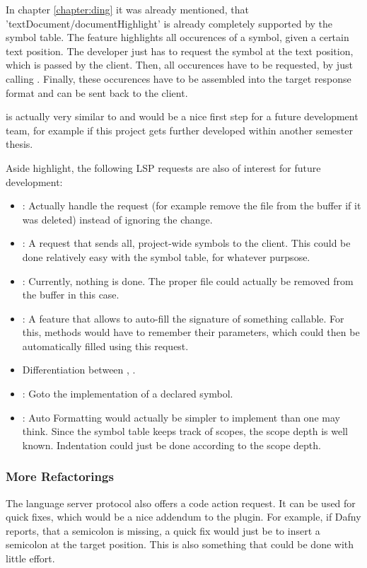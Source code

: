 In chapter \ref{chapter:ding} it was already mentioned, that 'textDocument/documentHighlight' is already completely supported by the symbol table.
The feature highlights all occurences of a symbol, given a certain text position.
The developer just has to request the symbol at the text position, which is passed by the client.
Then, all occurences have to be requested, by just calling .
Finally, these occurences have to be assembled into the target response format  and can be sent back to the client.

 is actually very similar to  and would be a nice first step for a future development team,
for example if this project gets further developed within another semester thesis.

Aside highlight, the following LSP requests are also of interest for future development:
\begin{itemize}
    \item {}: Actually handle the request (for example remove the file from the buffer if it was deleted) instead of ignoring the change.
    \item {}: A request that sends all, project-wide symbols to the client. This could be done relatively easy with the symbol table, for whatever purpsose.
    \item {}: Currently, nothing is done. The proper file could actually be removed from the buffer in this case.
    \item {}: A feature that allows to auto-fill the signature of something callable. For this, methods would have to remember their parameters, which could then be automatically filled using this request.
    \item Differentiation between , .
    \item {}: Goto the implementation of a declared symbol.
    \item {}: Auto Formatting would actually be simpler to implement than one may think. Since the symbol table keeps track of scopes, the scope depth is well known. Indentation could just be done according to the scope depth.
\end{itemize}

\subsubsection{More Refactorings}
The language server protocol also offers a code action request. It can be used for quick fixes, which would be a nice addendum to the plugin.
For example, if Dafny reports, that a semicolon is missing, a quick fix would just be to insert a semicolon at the target position.
This is also something that could be done with little effort.

